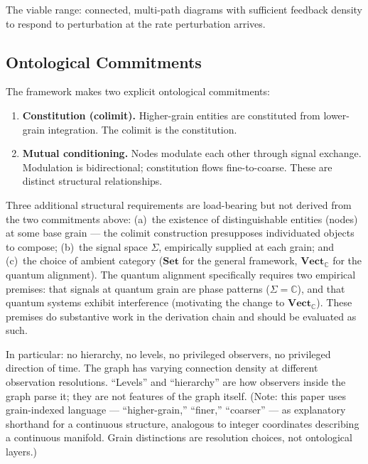 \documentclass[12pt,a4paper]{article}
\begin{document}
The viable range: connected, multi-path diagrams with sufficient feedback density to respond to perturbation at the rate perturbation arrives.

\subsection{Ontological Commitments}
\label{sec:ontological-commitments}

The framework makes two explicit ontological commitments:

\begin{enumerate}
  \item \textbf{Constitution (colimit).} Higher-grain entities are constituted from lower-grain integration. The colimit is the constitution.

  \item \textbf{Mutual conditioning.} Nodes modulate each other through signal exchange. Modulation is bidirectional; constitution flows fine-to-coarse. These are distinct structural relationships.
\end{enumerate}

Three additional structural requirements are load-bearing but not derived from the two commitments above: (a)~the existence of distinguishable entities (nodes) at some base grain --- the colimit construction presupposes individuated objects to compose; (b)~the signal space $\Sigma$, empirically supplied at each grain; and (c)~the choice of ambient category ($\mathbf{Set}$ for the general framework, $\mathbf{Vect}_{\mathbb{C}}$ for the quantum alignment). The quantum alignment specifically requires two empirical premises: that signals at quantum grain are phase patterns ($\Sigma = \mathbb{C}$), and that quantum systems exhibit interference (motivating the change to $\mathbf{Vect}_{\mathbb{C}}$). These premises do substantive work in the derivation chain and should be evaluated as such.

In particular: no hierarchy, no levels, no privileged observers, no privileged direction of time. The graph has varying connection density at different observation resolutions. ``Levels'' and ``hierarchy'' are how observers inside the graph parse it; they are not features of the graph itself. (Note: this paper uses grain-indexed language --- ``higher-grain,'' ``finer,'' ``coarser'' --- as explanatory shorthand for a continuous structure, analogous to integer coordinates describing a continuous manifold. Grain distinctions are resolution choices, not ontological layers.)
\end{document}

